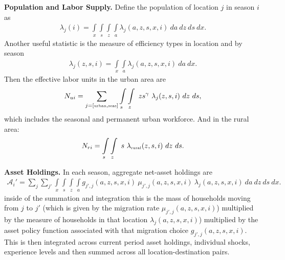 \documentclass[12pt,pdftex]{article}
\begin{document}
\textbf{Population and Labor Supply.} Define the population of location $j$ in season $i$ as
\begin{align}
\lambda_j(i) = \int\limits_{x} \int\limits_{s} \int\limits_{z} \int\limits_{a}  \lambda_j(a, z, s, x, i)  \ da  \ dz \ ds \ dx.
\label{appendix-eq:island_populaiton}
\end{align}
Another useful statistic is the measure of efficiency types in location and by season
\begin{align}
\lambda_j(z, s, i) = \int\limits_{x}  \int\limits_{a}  \lambda_j(a, z, s, x, i) \ da  \ dx.
\end{align}
Then the effective labor units in the urban area are
\begin{align}
N_{ui} = \sum_{j = [\mbox{\tiny urban}, \mbox{\tiny seas}]}\int\limits_{s} \int\limits_{z} \  z s^{\gamma} \ \lambda_j(z, s, i) \ dz \ ds,
\label{appendix-eq:urban_units}
\end{align}
which includes the seasonal and permanent urban workforce. And in the rural area:
\begin{align}
N_{ri} = \int\limits_{s} \int\limits_{z}  \  s \ \lambda_{\mbox{\tiny rural}}(z, s, i) \ dz \ ds.
\label{appendix-eq:rural_units}
\end{align}

\textbf{Asset Holdings.} In each season, aggregate net-asset holdings are
\begin{align}
\mathcal{A}_i' = \sum_{j}\sum_{j'}   \int\limits_{x} \int\limits_{s} \int\limits_{z} \int\limits_{a} g_{j',j}(a, z, s, x, i) \  \mu_{j',j}(a, z, s, x, i) \ \lambda_j(a, z, s, x, i) \ da  \ dz \ ds \ dx.
\label{appendix-eq:aggregate_asset}
\end{align}
inside of the summation and integration this is the mass of households moving from $j$ to $j'$ (which is given by the migration rate $\mu_{j',j}(a, z, s, x, i)$)  multiplied by the measure of households in that location $\lambda_j(a, z, s, x, i)$) multiplied by the asset policy function associated with that migration choice $g_{j',j}(a, z, s, x, i)$. This is then integrated across current period asset holdings, individual shocks, experience levels and then summed across all location-destination pairs.
\end{document}
